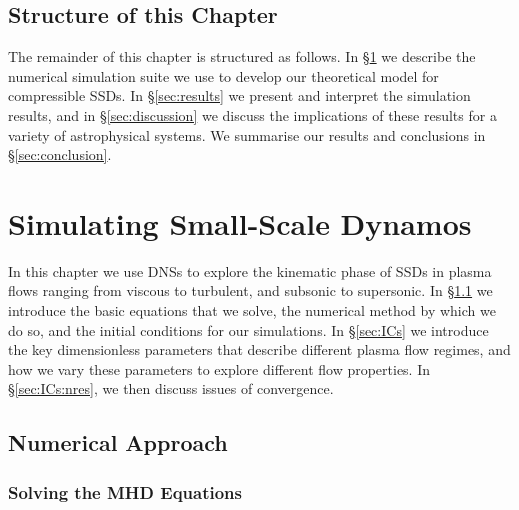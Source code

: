 \subsection{Structure of this Chapter}

The remainder of this chapter is structured as follows. In \S\ref{sec:numerics} we describe the numerical simulation suite we use to develop our theoretical model for compressible SSDs. In \S\ref{sec:results} we present and interpret the simulation results, and in \S\ref{sec:discussion} we discuss the implications of these results for a variety of astrophysical systems. We summarise our results and conclusions in \S\ref{sec:conclusion}.

\section{Simulating Small-Scale Dynamos}
\label{sec:numerics}

In this chapter we use DNSs to explore the kinematic phase of SSDs in plasma flows ranging from viscous to turbulent, and subsonic to supersonic. In \S\ref{sec:mhd_model} we introduce the basic equations that we solve, the numerical method by which we do so, and the initial conditions for our simulations. In \S\ref{sec:ICs} we introduce the key dimensionless parameters that describe different plasma flow regimes, and how we vary these parameters to explore different flow properties. In \S\ref{sec:ICs:nres}, we then discuss issues of convergence.

\subsection{Numerical Approach}
\label{sec:mhd_model}

\subsubsection{Solving the MHD Equations}

